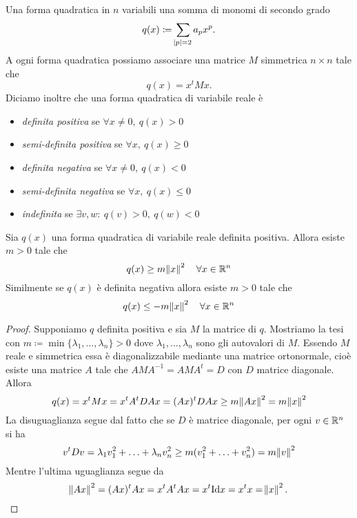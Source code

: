 \begin{definition}
	Una forma quadratica in $ n $ variabili una somma di monomi di secondo grado
	\begin{equation}
		q(x) \coloneqq \sum_{\abs{p} = 2} a_p x^p.
	\end{equation}
	A ogni forma quadratica possiamo associare una matrice $ M $ simmetrica $ n \times n $ tale che 
	\begin{equation*}
		q(x) = x^t M x.
	\end{equation*}
	Diciamo inoltre che una forma quadratica di variabile reale è 
	\begin{itemize}
		\item \emph{definita positiva} se $ \forall x \neq 0, \ q(x) > 0 $
		\item \emph{semi-definita positiva} se $ \forall x, \ q(x) \geq 0 $
		\item \emph{definita negativa} se $ \forall x \neq 0, \ q(x) < 0 $
		\item \emph{semi-definita negativa} se $ \forall x, \ q(x) \leq 0 $
		\item \emph{indefinita} se $ \exists v, w : \ q(v) > 0, \ q(w) < 0 $
	\end{itemize}
\end{definition}

\begin{prop} \label{prop:formquadratica}
	Sia $ q(x) $ una forma quadratica di variabile reale definita positiva. Allora esiste $ m > 0 $ tale che 
	\begin{equation}
		q(x) \geq m \norm{x}^2 \quad \forall x \in \mathbb{R}^n
	\end{equation}
	Similmente se $ q(x) $ è definita negativa allora esiste $ m > 0 $ tale che 
	\begin{equation}
		q(x) \leq -m \norm{x}^2 \quad \forall x \in \mathbb{R}^n
	\end{equation}
\end{prop}
%
\begin{proof}
	Supponiamo $ q $ definita positiva e sia $ M $ la matrice di $ q $. Mostriamo la tesi con $ m \coloneqq \min{\{\lambda_1,\ldots, \lambda_n\}} > 0 $ dove $ \lambda_1, \ldots, \lambda_n $ sono gli autovalori di $ M $. Essendo $ M $ reale e simmetrica essa è diagonalizzabile mediante una matrice ortonormale, cioè esiste una matrice $ A $ tale che $ A M A^{-1} = A M A^t = D $ con $ D $ matrice diagonale. Allora
	\[
		q(x) = x^t M x = x^t A^t D A x = (Ax)^t D Ax \geq m \norm{Ax}^2 = m \norm{x}^2
	\]
	La disuguaglianza segue dal fatto che se $ D $ è matrice diagonale, per ogni $ v \in \mathbb{R}^n $ si ha
	\[
		v^t D v = \lambda_1 v_1^2 + \ldots + \lambda_n v_n^2 \geq m (v_1^2 + \ldots + v_n^2) = m \norm{v}^2
	\]
	Mentre l'ultima uguaglianza segue da 
	\[
		\norm{Ax}^2 = (Ax)^t Ax = x^t A^t A x = x^t \mathrm{Id} x = x^t x = \norm{x}^2. \qedhere
	\]
\end{proof}

